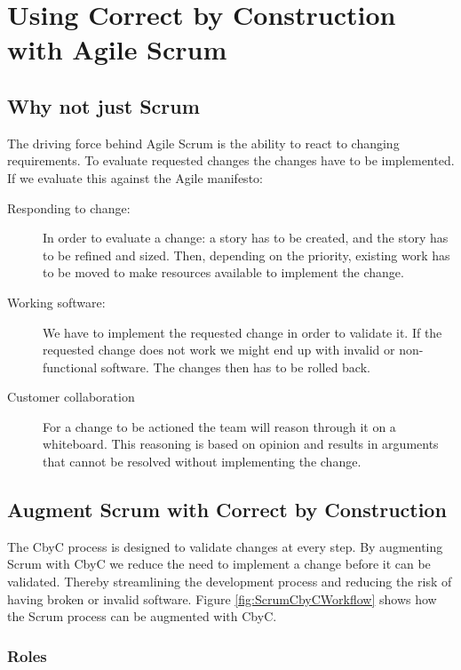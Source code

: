 
\chapter{Using Correct by Construction with Agile Scrum} %

\label{CbyCWithAgileScrum} %

\section{Why not just Scrum}

The driving force behind Agile Scrum is the ability to react to changing requirements.
To evaluate requested changes the changes have to be implemented. 
If we evaluate this against the Agile manifesto:
\begin{description}
	\item [Responding to change:]  In order to evaluate a change: a story has to be
		created, and the story has to be refined and sized. Then, depending on the 
		priority, existing work has to be moved to make resources available to implement
		the change. 
	\item [Working software:] We have to implement the requested change in order to
		validate it. If the requested change does not work we might end up with invalid or
		non-functional software. The changes then has to be rolled back.
	\item [Customer collaboration] For a change to be actioned the team will reason
		through it on a whiteboard. This reasoning is based on opinion and results in
		arguments that cannot be resolved without implementing the change.
\end{description}

\section{Augment Scrum with Correct by Construction}

The CbyC process is designed to validate changes at every step. By augmenting
Scrum with CbyC we reduce the need to implement a change before it can be validated.
Thereby streamlining the development process and reducing the risk of having broken or invalid software.
Figure \ref{fig:ScrumCbyCWorkflow} shows how the Scrum process can be augmented with CbyC.

\subsection{Roles}

